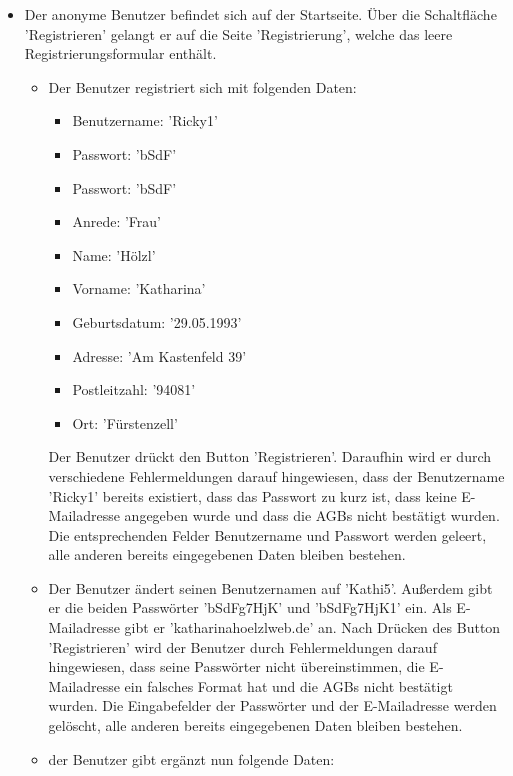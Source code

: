 \documentclass[a4paper]{scrreprt}
\begin{document}
\begin{itemize}
					
				\item {} 
				 Der anonyme Benutzer befindet sich auf der Startseite. Über die Schaltfläche 'Registrieren' gelangt er auf die Seite 'Registrierung', welche das leere Registrierungsformular enthält. 		
					\begin{itemize}
						\item Der Benutzer registriert sich mit folgenden Daten: 
							\begin{itemize}
								\item Benutzername: 'Ricky1'
								\item Passwort: 'bSdF'
								\item Passwort: 'bSdF'
								\item Anrede: 'Frau'
								\item Name: 'Hölzl'
								\item Vorname: 'Katharina'
								\item Geburtsdatum: '29.05.1993'
								\item Adresse: 'Am Kastenfeld 39'
								\item Postleitzahl: '94081'
								\item Ort: 'Fürstenzell'
							\end{itemize}
						Der Benutzer drückt den Button 'Registrieren'. Daraufhin wird er durch verschiedene Fehlermeldungen darauf hingewiesen, dass der Benutzername 'Ricky1' bereits existiert, dass das Passwort zu kurz ist, dass keine E-Mailadresse angegeben wurde und dass die AGBs nicht bestätigt wurden. Die entsprechenden Felder Benutzername und Passwort werden geleert, alle anderen bereits eingegebenen Daten bleiben bestehen.
						
						\item Der Benutzer ändert seinen Benutzernamen auf 'Kathi5'. Außerdem gibt er die beiden Passwörter 'bSdFg7HjK' und 'bSdFg7HjK1' ein. Als E-Mailadresse gibt er 'katharinahoelzlweb.de' an. Nach Drücken des Button 'Registrieren' wird der Benutzer durch Fehlermeldungen darauf hingewiesen, dass seine Passwörter nicht übereinstimmen, die E-Mailadresse ein falsches Format hat und die AGBs nicht bestätigt wurden. Die Eingabefelder der Passwörter und der E-Mailadresse werden gelöscht, alle anderen bereits eingegebenen Daten bleiben bestehen.
						
						\item der Benutzer gibt ergänzt nun folgende Daten: 
							\begin{itemize}


\end{itemize}
\end{itemize}
\end{itemize}
\end{document}
